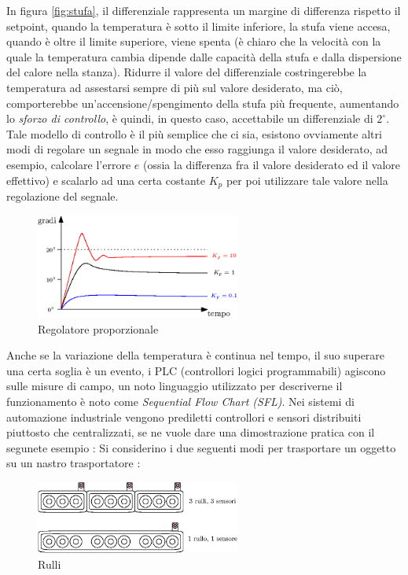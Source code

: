 \documentclass[10pt, letterpaper]{report}
\begin{document}
In figura \ref{fig:stufa}, il differenziale rappresenta un margine 
di differenza rispetto il setpoint, quando la temperatura è 
sotto il limite inferiore, la stufa viene accesa, quando è oltre il limite 
superiore, viene spenta (è chiaro che la velocità con la quale la temperatura 
cambia dipende dalle capacità della stufa e dalla dispersione del calore nella stanza).\acc 
Ridurre il valore del differenziale costringerebbe la temperatura ad assestarsi 
sempre di più sul valore desiderato, ma ciò, comporterebbe un'accensione/spengimento della 
stufa più frequente, aumentando lo \textit{sforzo di controllo}, è quindi, in questo 
caso, accettabile un differenziale di $2^\circ$.\acc 
Tale modello di controllo è il più semplice che ci sia, esistono ovviamente altri modi di regolare un 
segnale in modo che esso raggiunga il valore desiderato, ad esempio, calcolare l'errore $e$ (ossia la differenza 
fra il valore desiderato ed il valore effettivo) e scalarlo ad una certa costante $K_p$ per poi utilizzare tale 
valore nella regolazione del segnale.
\begin{center}
    \begin{figure}[h!]
        \centering
        \includegraphics[width=0.6\textwidth ]{images/stufaEsempioPROP.eps}
        \caption{Regolatore proporzionale}
        \label{fig:regPropStuda}
   \end{figure} 
\end{center}
Anche se la variazione della temperatura è continua nel tempo, il suo 
superare una certa soglia è un evento, i PLC (controllori logici programmabili) 
agiscono sulle misure di campo, un noto linguaggio utilizzato per descriverne 
il funzionamento è noto come \textit{Sequential Flow Chart (SFL)}.\acc 
Nei sistemi di automazione industriale vengono prediletti controllori e sensori distribuiti piuttosto 
che centralizzati, se ne vuole dare una dimostrazione pratica con il segunete 
esempio : Si considerino i due seguenti modi per trasportare un oggetto 
su un nastro trasportatore :\begin{center}
    \begin{figure}[h!]
        \centering
        \includegraphics[width=0.6\textwidth ]{images/rulli.eps}
        \caption{Rulli}
        \label{fig:rulli}
   \end{figure} 
\end{center}
\end{document}
